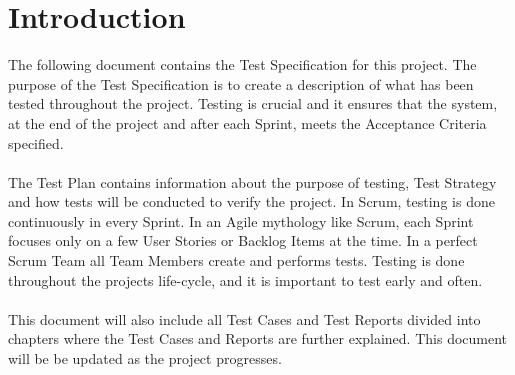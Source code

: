 \section{Introduction}
The following document contains the Test Specification for this project. The purpose of the Test Specification is to create a description of what has been tested throughout the project. Testing is crucial and it ensures that the system, at the end of the project and after each Sprint, meets the Acceptance Criteria specified.\\
\\
The Test Plan contains information about the purpose of testing, Test Strategy and how tests will be conducted to verify the project. In Scrum, testing is done continuously in every Sprint. In an Agile mythology like Scrum, each Sprint focuses only on a few User Stories or Backlog Items at the time. In a perfect Scrum Team all Team Members create and performs tests. Testing is done throughout the projects life-cycle, and it is important to test early and often.\\
\\
This document will also include all Test Cases and Test Reports divided into chapters where the Test Cases and Reports are further explained. This document will be be updated as the project progresses.
\newpage